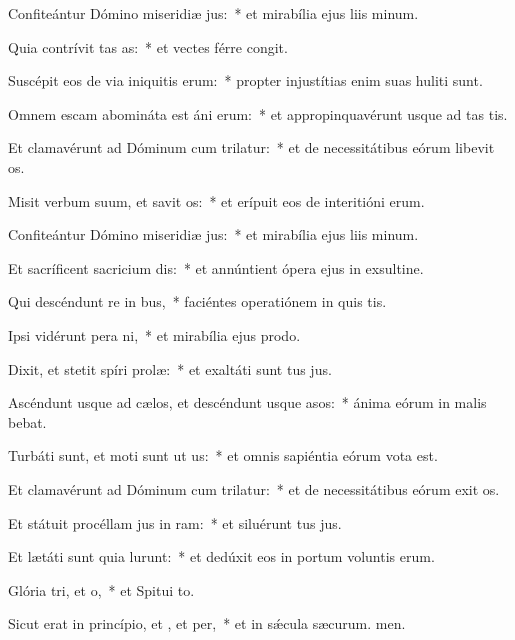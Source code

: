 \item Confiteántur Dómino miseridiæ jus:~* et mirabília ejus liis minum.
\item Quia contrívit tas as:~* et vectes férre congit.
\item Suscépit eos de via iniquitis erum:~* propter injustítias enim suas huliti sunt.
\item Omnem escam abomináta est áni erum:~* et appropinquavérunt usque ad tas tis.
\item Et clamavérunt ad Dóminum cum trilatur:~* et de necessitátibus eórum libevit os.
\item Misit verbum suum, et savit os:~* et erípuit eos de interitióni erum.
\item Confiteántur Dómino miseridiæ jus:~* et mirabília ejus liis minum.
\item Et sacríficent sacricium dis:~* et annúntient ópera ejus in exsultine.
\item Qui descéndunt re in bus,~* faciéntes operatiónem in quis tis.
\item Ipsi vidérunt pera ni,~* et mirabília ejus  prodo.
\item Dixit, et stetit spíri prolæ:~* et exaltáti sunt tus jus.
\item Ascéndunt usque ad cælos, et descéndunt usque  asos:~* ánima eórum in malis bebat.
\item Turbáti sunt, et moti sunt ut us:~* et omnis sapiéntia eórum vota est.
\item Et clamavérunt ad Dóminum cum trilatur:~* et de necessitátibus eórum exit os.
\item Et státuit procéllam jus in ram:~* et siluérunt tus jus.
\item Et lætáti sunt quia lurunt:~* et dedúxit eos in portum voluntis erum.
\item Glória tri, et o,~* et Spitui to.
\item Sicut erat in princípio, et , et per,~* et in sǽcula sæcurum. men.
